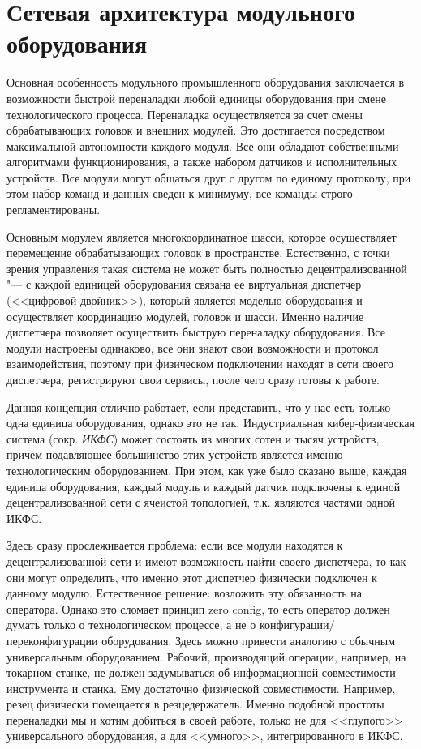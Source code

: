 \section{Сетевая архитектура модульного оборудования}\label{sec:ch3/sec2}

Основная особенность модульного промышленного оборудования заключается в возможности быстрой переналадки любой единицы оборудования при смене технологического процесса. Переналадка осуществляется за счет смены обрабатывающих головок и внешних модулей.  Это достигается посредством максимальной автономности каждого модуля. Все они обладают собственными алгоритмами функционирования, а также набором датчиков и исполнительных устройств. Все модули могут общаться друг с другом по единому протоколу, при этом набор команд и данных сведен к минимуму, все команды строго регламентированы.

Основным модулем является многокоординатное шасси, которое осуществляет перемещение обрабатывающих головок в пространстве. Естественно, с точки зрения управления такая система не может быть полностью децентрализованной "--- с каждой единицей оборудования связана ее виртуальная диспетчер (<<цифровой двойник>>), который является моделью оборудования и осуществляет координацию модулей, головок и шасси. Именно наличие диспетчера позволяет осуществить быструю переналадку оборудования. Все модули настроены одинаково, все они знают свои возможности и протокол взаимодействия, поэтому при физическом подключении находят в сети своего диспетчера, регистрируют свои сервисы, после чего сразу готовы к работе.

Данная концепция отлично работает, если представить, что у нас есть только одна единица оборудования, однако это не так. Индустриальная кибер-физическая система (сокр. \textit{ИКФС}) может состоять из многих сотен и тысяч устройств, причем подавляющее большинство этих устройств является именно технологическим оборудованием. При этом, как уже было сказано выше, каждая единица оборудования, каждый модуль и каждый датчик подключены к единой децентрализованной сети с ячеистой топологией, т.\:к. являются частями одной ИКФС.

Здесь сразу прослеживается проблема: если все модули находятся к децентрализованной сети и имеют возможность найти своего диспетчера, то как они могут определить, что именно этот диспетчер физически подключен к данному модулю. Естественное решение: возложить эту обязанность на оператора. Однако это сломает принцип zero config, то есть оператор должен думать только о технологическом процессе, а не о конфигурации/переконфигурации оборудования. Здесь можно привести аналогию с обычным универсальным оборудованием. Рабочий, производящий операции, например, на токарном станке, не должен задумываться об информационной совместимости инструмента и станка. Ему достаточно физической совместимости. Например, резец физически помещается в резцедержатель. Именно подобной простоты переналадки мы и хотим добиться в своей работе, только не для <<глупого>> универсального оборудования, а для <<умного>>, интегрированного в ИКФС.


